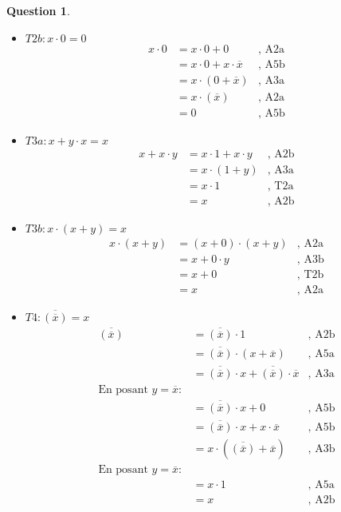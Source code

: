 \documentclass[11pt,a4paper]{article}
\theoremstyle{definition}%
\newtheorem{Q}{Question}[] %
\begin{document}
\begin{Q}
{\begin{itemize}
	\item $T2b : x \cdot 0=0$
	\begin{align*}
		x \cdot 0 & = x \cdot 0 + 0 &\mbox{, A2a} \\
		& = x \cdot 0 + x \cdot \overline{x}&\mbox{, A5b} \\
		& = x \cdot (0 + \overline{x}) &\mbox{, A3a} \\
		& = x \cdot (\overline{x}) &\mbox{, A2a} \\
		& = 0 &\mbox{, A5b}
	\end{align*}

	\item $T3a : x+y \cdot x=x$
	\begin{align*}
		x + x \cdot y & = x \cdot 1 + x \cdot y &\mbox{, A2b}\\
		& = x \cdot (1 + y)&\mbox{, A3a}\\
		& = x \cdot 1&\mbox{, T2a} \\
		& = x &\mbox{, A2b}
	\end{align*}

	\item $T3b : x \cdot (x+y)=x$
	\begin{align*}
		x \cdot (x+y) & = (x+0) \cdot (x+y) &\mbox{, A2a}\\
		& = x + 0 \cdot y &\mbox{, A3b}\\
		& = x + 0 &\mbox{, T2b} \\
		& = x &\mbox{, A2a}
	\end{align*}

	\item $T4 : \overline{(\overline{x})}=x$
	\begin{align*}
		\overline{(\overline{x})} & = \overline{(\overline{x})} \cdot 1 &\mbox{, A2b}\\
		& = \overline{(\overline{x})} \cdot (x + \overline{x}) &\mbox{, A5a}\\
		& = \overline{(\overline{x})} \cdot x + \overline{(\overline{x})} \cdot \overline{x} &\mbox{, A3a}\\
		\mbox{En posant } y = \overline{x} : && \\
		& = \overline{(\overline{x})} \cdot x + 0 &\mbox{, A5b}\\
		& = \overline{(\overline{x})} \cdot x + x \cdot \overline{x} &\mbox{, A5b}\\
		& = x\cdot (\overline{(\overline{x})} + \overline{x})&\mbox{, A3b}\\
		\mbox{En posant } y = \overline{x} : && \\
		& = x \cdot 1 &\mbox{, A5a}\\
		& = x & \mbox{, A2b}
	\end{align*}


\end{itemize}}
\end{Q}
\end{document}

